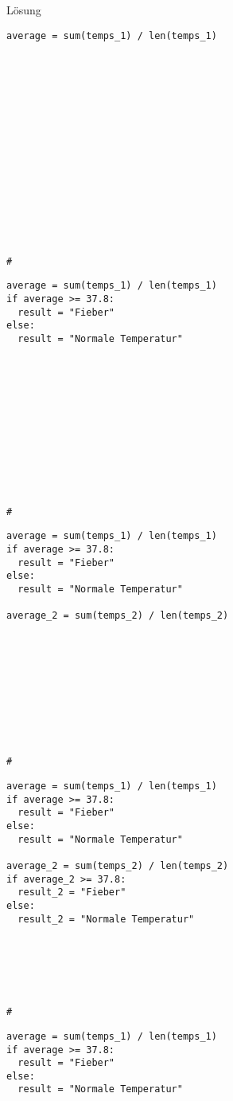 \begin{fragile}{}
\begin{block}{Lösung }
\vspace{2pt}
\begin{overprint}
\begin{verbatim}
average = sum(temps_1) / len(temps_1)
















# 
\end{verbatim}
\begin{verbatim}
average = sum(temps_1) / len(temps_1)
if average >= 37.8: 
  result = "Fieber"
else: 
  result = "Normale Temperatur"












#  
\end{verbatim}
\begin{verbatim}
average = sum(temps_1) / len(temps_1)
if average >= 37.8: 
  result = "Fieber"
else: 
  result = "Normale Temperatur"

average_2 = sum(temps_2) / len(temps_2)










#
\end{verbatim}
\begin{verbatim}
average = sum(temps_1) / len(temps_1)
if average >= 37.8: 
  result = "Fieber"
else: 
  result = "Normale Temperatur"

average_2 = sum(temps_2) / len(temps_2)
if average_2 >= 37.8:
  result_2 = "Fieber"
else: 
  result_2 = "Normale Temperatur"






#
\end{verbatim}
\begin{verbatim}
average = sum(temps_1) / len(temps_1)
if average >= 37.8: 
  result = "Fieber"
else: 
  result = "Normale Temperatur"


\end{verbatim}
\end{overprint}
\end{block}
\end{fragile}
